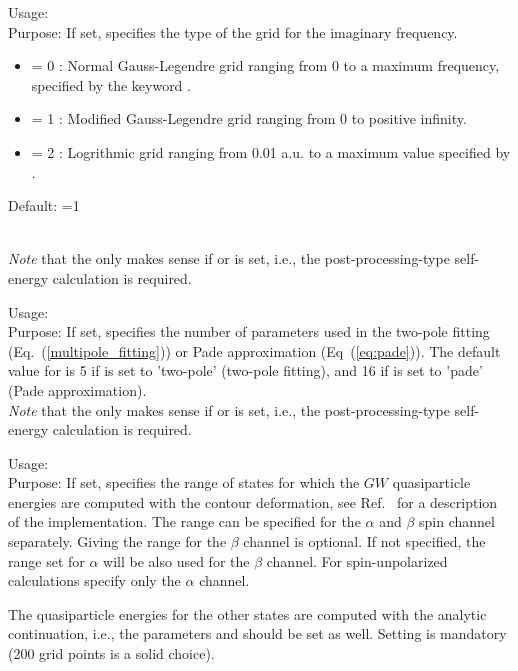 { \noindent
  Usage:   \\[1.0ex]
  Purpose: If set, specifies the type of the grid for the imaginary frequency.
  \begin{itemize}
    \item {} = 0 : Normal Gauss-Legendre grid ranging from 0
     to a maximum frequency, specified by the keyword .
    \item {} = 1 : Modified Gauss-Legendre grid ranging from 0 to positive infinity.
    \item {} = 2 : Logrithmic grid ranging from 0.01 a.u. to a maximum value specified by
       .
  \end{itemize}
  Default: =1
}\\[1.0ex]

\emph{Note} that the  only makes sense if 
 or  is set, i.e., the
post-processing-type self-energy calculation is required.

{ \noindent
  Usage:   \\[1.0ex]
  Purpose: If set, specifies the number of parameters used in the two-pole
  fitting (Eq.~(\ref{multipole_fitting})) or Pade approximation (Eq~(\ref{eq:pade})).
  The default value for  is 5 if  is
  set to 'two-pole' (two-pole fitting), and 16 if
   is set to 'pade' (Pade approximation).  
}\\[1.0ex]

\emph{Note} that the  only makes sense if 
 or  is set, i.e., the
post-processing-type self-energy calculation is required.

{ \noindent
  Usage:  
         \\[1.0ex]
  Purpose: If set, specifies the range of states for which the $GW$ quasiparticle 
  energies are computed with the contour deformation, see Ref.~\cite{Golze2018}
  for a description of the implementation. The range can be specified for the $\alpha$ and $\beta$
  spin channel separately. Giving the range for the $\beta$ channel is optional. If not specified, the range set for
  $\alpha$ will be also used for the $\beta$ channel. For spin-unpolarized calculations specify only the
  $\alpha$ channel.\par
  The quasiparticle energies for 
  the other states are computed with the analytic continuation, i.e., the parameters
   and  should be set as well. 
  Setting  is mandatory (200 grid points is a 
  solid choice).
}

